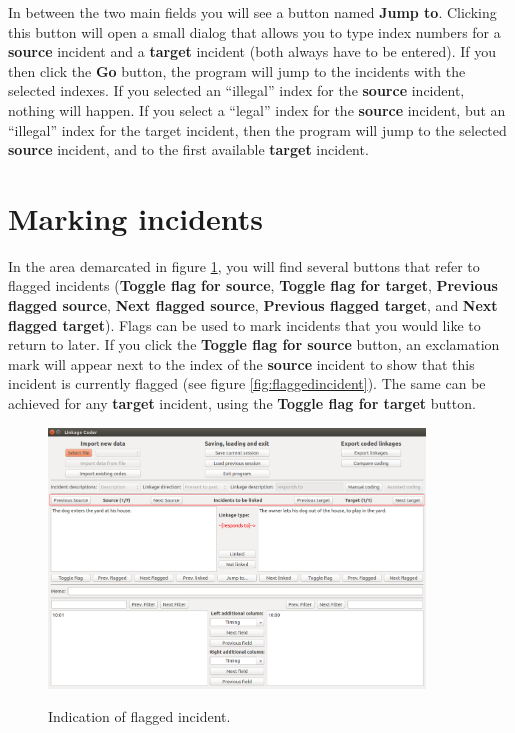 \documentclass{memoir}
\begin{document}
In between the two main fields you will see a button named \textbf{Jump to}. Clicking this button will open a small dialog that allows you to type index numbers for a \textbf{source} incident and a \textbf{target} incident (both always have to be entered). If you then click the \textbf{Go} button, the program will jump to the incidents with the selected indexes. If you selected an ``illegal'' index for the \textbf{source} incident, nothing will happen. If you select a ``legal'' index for the \textbf{source} incident, but an ``illegal'' index for the target incident, then the program will jump to the selected \textbf{source} incident, and to the first available \textbf{target} incident.

\section{Marking incidents}
\label{sec:markingincidents}

In the area demarcated in figure \ref{fig:flagoptions}, you will find several buttons that refer to flagged incidents (\textbf{Toggle flag for source}, \textbf{Toggle flag for target}, \textbf{Previous flagged source}, \textbf{Next flagged source}, \textbf{Previous flagged target}, and \textbf{Next flagged target}). Flags can be used to mark incidents that you would like to return to later. If you click the \textbf{Toggle flag for source} button, an exclamation mark will appear next to the index of the \textbf{source} incident to show that this incident is currently flagged (see figure \ref{fig:flaggedincident}). The same can be achieved for any \textbf{target} incident, using the \textbf{Toggle flag for target} button.

\begin{figure}[h!]
  \centering
  \caption{Indication of flagged incident.}
  \includegraphics[width=100mm]{Screenshot_7.pdf}
  \label{fig:flagoptions}
\end{figure}
\end{document}
